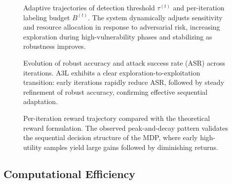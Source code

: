 \documentclass[review,1p,times,number]{elsarticle}
\begin{document}
\begin{figure}[htbp]
\centering
\caption{Adaptive trajectories of detection threshold $\tau^{(t)}$ and
  per-iteration labeling budget $B^{(t)}$. The system dynamically adjusts
  sensitivity and resource allocation in response to adversarial risk,
  increasing exploration during high-vulnerability phases and stabilizing
  as robustness improves.}
\label{fig:tau_budget}
\end{figure}

\begin{figure}[htbp]
\centering
\caption{Evolution of robust accuracy and attack success rate (ASR)
  across iterations. A3L exhibits a clear exploration-to-exploitation
  transition: early iterations rapidly reduce ASR, followed by steady
  refinement of robust accuracy, confirming effective sequential
  adaptation.}
\label{fig:robacc_asr}
\end{figure}

\begin{figure}[htbp]
\centering
\caption{Per-iteration reward trajectory compared with the theoretical
  reward formulation. The observed peak-and-decay pattern validates the
  sequential decision structure of the MDP, where early high-utility
  samples yield large gains followed by diminishing returns.}
\label{fig:reward}
\end{figure}

\subsection{Computational Efficiency}
\label{sec:computational}
\end{document}
